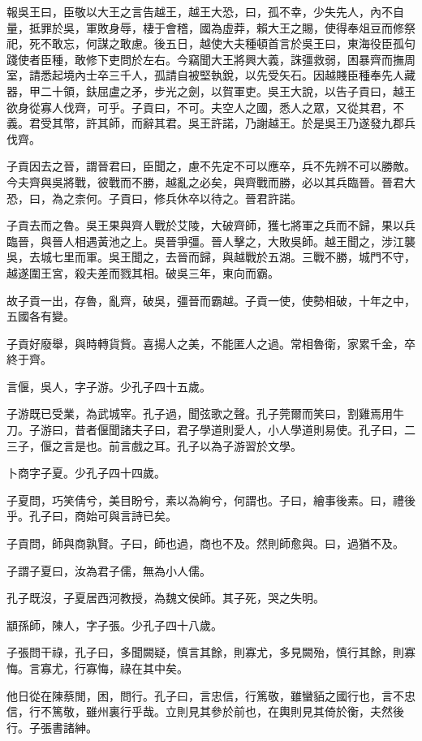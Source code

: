 報吳王曰，臣敬以大王之言告越王，越王大恐，曰，孤不幸，少失先人，內不自量，抵罪於吳，軍敗身辱，棲于會稽，國為虛莽，賴大王之賜，使得奉俎豆而修祭祀，死不敢忘，何謀之敢慮。後五日，越使大夫種頓首言於吳王曰，東海役臣孤句踐使者臣種，敢修下吏問於左右。今竊聞大王將興大義，誅彊救弱，困暴齊而撫周室，請悉起境內士卒三千人，孤請自被堅執銳，以先受矢石。因越賤臣種奉先人藏器，甲二十領，鈇屈盧之矛，步光之劍，以賀軍吏。吳王大說，以告子貢曰，越王欲身從寡人伐齊，可乎。子貢曰，不可。夫空人之國，悉人之眾，又從其君，不義。君受其幣，許其師，而辭其君。吳王許諾，乃謝越王。於是吳王乃遂發九郡兵伐齊。

子貢因去之晉，謂晉君曰，臣聞之，慮不先定不可以應卒，兵不先辨不可以勝敵。今夫齊與吳將戰，彼戰而不勝，越亂之必矣，與齊戰而勝，必以其兵臨晉。晉君大恐，曰，為之柰何。子貢曰，修兵休卒以待之。晉君許諾。

子貢去而之魯。吳王果與齊人戰於艾陵，大破齊師，獲七將軍之兵而不歸，果以兵臨晉，與晉人相遇黃池之上。吳晉爭彊。晉人擊之，大敗吳師。越王聞之，涉江襲吳，去城七里而軍。吳王聞之，去晉而歸，與越戰於五湖。三戰不勝，城門不守，越遂圍王宮，殺夫差而戮其相。破吳三年，東向而霸。

故子貢一出，存魯，亂齊，破吳，彊晉而霸越。子貢一使，使勢相破，十年之中，五國各有變。

子貢好廢舉，與時轉貨貲。喜揚人之美，不能匿人之過。常相魯衛，家累千金，卒終于齊。

言偃，吳人，字子游。少孔子四十五歲。

子游既已受業，為武城宰。孔子過，聞弦歌之聲。孔子莞爾而笑曰，割雞焉用牛刀。子游曰，昔者偃聞諸夫子曰，君子學道則愛人，小人學道則易使。孔子曰，二三子，偃之言是也。前言戲之耳。孔子以為子游習於文學。

卜商字子夏。少孔子四十四歲。

子夏問，巧笑倩兮，美目盼兮，素以為絢兮，何謂也。子曰，繪事後素。曰，禮後乎。孔子曰，商始可與言詩已矣。

子貢問，師與商孰賢。子曰，師也過，商也不及。然則師愈與。曰，過猶不及。

子謂子夏曰，汝為君子儒，無為小人儒。

孔子既沒，子夏居西河教授，為魏文侯師。其子死，哭之失明。

顓孫師，陳人，字子張。少孔子四十八歲。

子張問干祿，孔子曰，多聞闕疑，慎言其餘，則寡尤，多見闕殆，慎行其餘，則寡悔。言寡尤，行寡悔，祿在其中矣。

他日從在陳蔡閒，困，問行。孔子曰，言忠信，行篤敬，雖蠻貊之國行也，言不忠信，行不篤敬，雖州裏行乎哉。立則見其參於前也，在輿則見其倚於衡，夫然後行。子張書諸紳。


